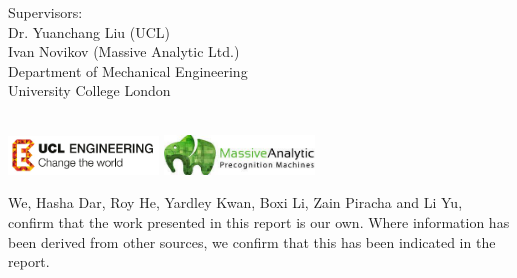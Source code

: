 \begin{titlepage}
\begin{minipage}{0.05\textwidth}
    
\end{minipage}
\begin{minipage}{0.9\textwidth}
    \begin{flushleft}
    Supervisors:\\
    Dr. Yuanchang Liu (UCL)\\
    Ivan Novikov (Massive Analytic Ltd.)\\[0.5cm]
    Department of Mechanical Engineering\\
    University College London\\
    \\[1.5cm]
    \begin{center}
    \includegraphics[width=4cm]{Title/ucleng.jpg} \qquad
    \includegraphics[width=4cm]{Title/download.jpg}\\[1.5cm]
    \end{center}
    We, Hasha Dar, Roy He, Yardley Kwan, Boxi Li, Zain Piracha and Li Yu, confirm that the work presented in this report is our own. Where information has been derived from other sources, we confirm that this has been indicated in the report.
    \end{flushleft}
\end{minipage}
\begin{minipage}{0.05\textwidth}
    
\end{minipage}

  \vfill %

\end{titlepage}